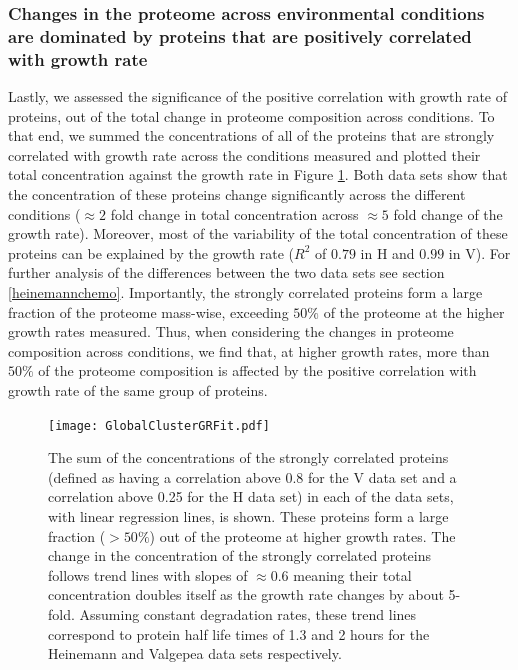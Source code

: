 \documentclass[notitlepage]{article}
\begin{document}
\subsubsection{Changes in the proteome across environmental conditions are dominated by proteins that are positively correlated with growth rate}
Lastly, we assessed the significance of the positive correlation with growth rate of proteins, out of the total change in proteome composition across conditions.
To that end, we summed the concentrations of all of the proteins that are strongly correlated with growth rate across the conditions measured and plotted their total concentration against the growth rate in Figure \ref{fig:globalgrcorr}.
Both data sets show that the concentration of these proteins change significantly across the different conditions ($\approx 2$ fold change in total concentration across $\approx 5$ fold change of the growth rate).
Moreover, most of the variability of the total concentration of these proteins can be explained by the growth rate ($R^2$ of $0.79$ in H and $0.99$ in V). 
For further analysis of the differences between the two data sets see section \ref{heinemannchemo}.
Importantly, the strongly correlated proteins form a large fraction of the proteome mass-wise, exceeding $50\%$ of the proteome at the higher growth rates measured.
Thus, when considering the changes in proteome composition across conditions, we find that, at higher growth rates, more than $50\%$ of the proteome composition is affected by the positive correlation with growth rate of the same group of proteins.

\begin{figure}[h]
\centering
\texttt{[image: GlobalClusterGRFit.pdf]}
\caption{
The sum of the concentrations of the strongly correlated proteins (defined as having a correlation above 0.8 for the V data set and a correlation above 0.25 for the H data set) in each of the data sets, with linear regression lines, is shown.
These proteins form a large fraction ($>50\%$) out of the proteome at higher growth rates.
The change in the concentration of the strongly correlated proteins follows trend lines with slopes of $\approx 0.6$ meaning their total concentration doubles itself as the growth rate changes by about 5-fold.
Assuming constant degradation rates, these trend lines correspond to protein half life times of 1.3 and 2 hours for the Heinemann and Valgepea data sets respectively.
}
\label{fig:globalgrcorr}
\end{figure}
\end{document}

